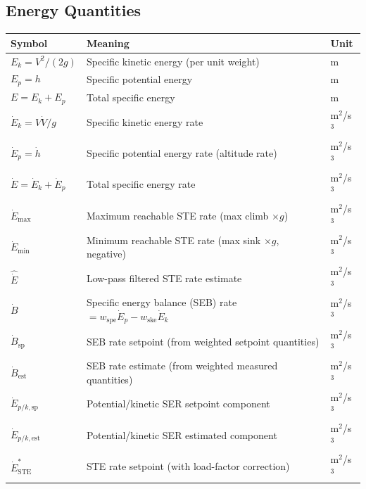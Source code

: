 \documentclass[12pt,a4paper]{article}
\begin{document}
\subsection*{Energy Quantities}
\begin{center}\begin{tabular}{lll}\toprule
Symbol & Meaning & Unit \\\midrule
$E_k = V^2/(2g)$ & Specific kinetic energy (per unit weight) & m \\
$E_p = h$ & Specific potential energy & m \\
$E = E_k + E_p$ & Total specific energy & m \\
$\dot{E}_k = V\dot{V}/g$ & Specific kinetic energy rate & m$^2$/s$^3$ \\
$\dot{E}_p = \dot{h}$ & Specific potential energy rate (altitude rate) & m$^2$/s$^3$ \\
$\dot{E} = \dot{E}_k + \dot{E}_p$ & Total specific energy rate & m$^2$/s$^3$ \\
$\dot{E}_{\max}$ & Maximum reachable STE rate (max climb $\times g$) & m$^2$/s$^3$ \\
$\dot{E}_{\min}$ & Minimum reachable STE rate (max sink $\times g$, negative) & m$^2$/s$^3$ \\
$\hat{\dot{E}}$ & Low-pass filtered STE rate estimate & m$^2$/s$^3$ \\
$\dot{B}$ & Specific energy balance (SEB) rate $= w_{\text{spe}}\dot{E}_p - w_{\text{ske}}\dot{E}_k$ & m$^2$/s$^3$ \\
$\dot{B}_{\text{sp}}$ & SEB rate setpoint (from weighted setpoint quantities) & m$^2$/s$^3$ \\
$\dot{B}_{\text{est}}$ & SEB rate estimate (from weighted measured quantities) & m$^2$/s$^3$ \\
$\dot{E}_{p/k,\text{sp}}$ & Potential/kinetic SER setpoint component & m$^2$/s$^3$ \\
$\dot{E}_{p/k,\text{est}}$ & Potential/kinetic SER estimated component & m$^2$/s$^3$ \\
$\dot{E}^*_{\text{STE}}$ & STE rate setpoint (with load-factor correction) & m$^2$/s$^3$ \\
\bottomrule\end{tabular}\end{center}
\end{document}
